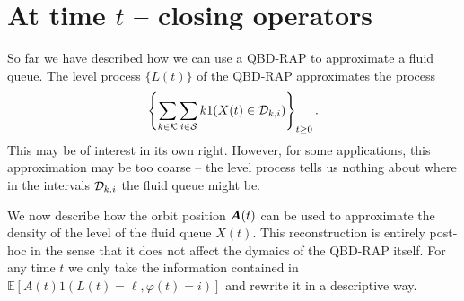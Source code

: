 
\section{At time \(t\) -- closing operators}\label{sec: closing}
So far we have described how we can use a QBD-RAP to approximate a fluid queue. The level process \(\{L(t)\}\) of the QBD-RAP approximates the process 
\begin{align}
	\displaystyle \left\{\sum_{k\in\mathcal K}\sum_{i\in\mathcal{S}} k1(X(t)\in\mathcal{D}_{k,i})\right\}_{t\geq 0}. \label{eqn: kfafj}
\end{align}
This may be of interest in its own right. However, for some applications, this approximation may be too coarse -- the level process tells us nothing about where in the intervals \(\mathcal{D}_{k,i}\) the fluid queue might be. 

We now describe how the orbit position \(\boldsymbol A(t)\) can be used to approximate the density of the level of the fluid queue \(X(t)\). This reconstruction is entirely post-hoc in the sense that it does not affect the dymaics of the QBD-RAP itself. For any time \(t\) we only take the information contained in \(\mathbb E[A(t)1(L(t)=\ell,\varphi(t)=i)]\) and rewrite it in a descriptive way. 


